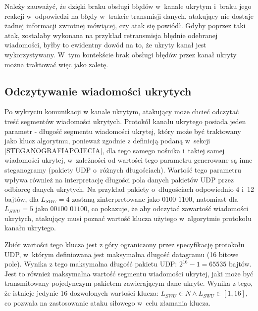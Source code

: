 \documentclass[a4paper, twoside, openright, 12pt]{report}
\begin{document}
       Należy zauważyć, że dzięki braku obsługi błędów w~kanale ukrytym
       i~braku jego reakcji w~odpowiedzi na błędy w~trakcie transmisji danych, atakujący
       nie dostaje żadnej informacji zwrotnej mówiącej, czy atak się powiódł. Gdyby
       poprzez taki atak, zostałaby wykonana na przykład retransmisja błędnie odebranej
       wiadomości, byłby to ewidentny dowód na to, że ukryty kanał jest wykorzystywany.
       W~tym kontekście brak obsługi błędów przez kanał ukryty można traktować więc
       jako zaletę.

       \subsection{Odczytywanie wiadomości ukrytych}
       Po wykryciu komunikacji w kanale ukrytym, atakujący może chcieć
       odczytać treść segmentów wiadomości ukrytych. Protokół kanału ukrytego posiada
       jeden parametr - długość segmentu wiadomości ukrytej, który
       może być traktowany jako klucz algorytmu, ponieważ zgodnie z definicją podaną
       w~sekcji \ref{STEGANOGRAFIAPOJECIA}, dla tego samego nośnika i~takiej samej
       wiadomości ukrytej, w~zależności od wartości tego parametru generowane są
       inne steganogramy (pakiety UDP o~różnych długościach). Wartość tego parametru wpływa również
       na interpretację długości pola danych pakietów UDP przez odbiorcę danych ukrytych.
       Na przykład pakiety o~długościach odpowiednio 4 i~12 bajtów, dla \( L_{SWU} = 4 \)
       zostaną zinterpretowane jako \( 0100 \) \( 1100 \), natomiast dla \( L_{SWU} = 5 \)
       jako \( 00100 \) \( 01100 \), co pokazuje, że aby odczytać zawartość wiadomości
       ukrytych, atakujący musi poznać wartość klucza użytego w~algorytmie protokołu
       kanału ukrytego.

       Zbiór wartości tego
       klucza jest z góry ograniczony przez specyfikację protokołu UDP, w~którym
       definiowana jest maksymalna długość datagramu (16 bitowe pole).
       Wynika z tego maksymalna długość pakietu UDP: \(2^{16} - 1 = 65535\) bajtów. Jest to również maksymalna
       wartość segmentu wiadomości ukrytej, jaki może być transmitowany pojedynczym
       pakietem zawierającym dane ukryte. Wynika z tego, że istnieje jedynie 16
       dozwolonych wartości klucza: \( L_{SWU} \in N \land L_{SWU} \in [1, 16] \),
       co pozwala na zastosowanie ataku siłowego w~celu złamania klucza.
\end{document}
